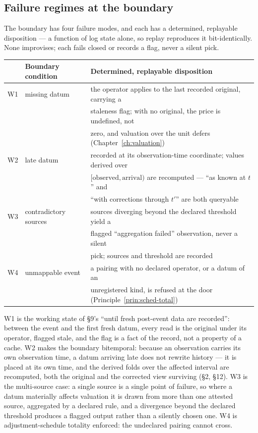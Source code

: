 \subsection{Failure regimes at the boundary}\label{sec:failures}

The boundary has four failure modes, and each has a determined, replayable disposition --- a
function of log state alone, so replay reproduces it bit-identically. None improvises; each
fails closed or records a flag, never a silent pick.

\begin{center}
\begin{tabular}{@{}lll@{}}
\toprule
 & Boundary condition & Determined, replayable disposition \\
\midrule
W1 & missing datum & the operator applies to the last recorded original, carrying a \\
   &               & staleness flag; with no original, the price is undefined, not \\
   &               & zero, and valuation over the unit defers (Chapter~\ref{ch:valuation}) \\
W2 & late datum & recorded at its observation-time coordinate; values derived over \\
   &            & $[\text{observed},\text{arrival})$ are recomputed --- ``as known at $t$'' and \\
   &            & ``with corrections through $t'$'' are both queryable \\
W3 & contradictory sources & sources diverging beyond the declared threshold yield a \\
   &                       & flagged ``aggregation failed'' observation, never a silent \\
   &                       & pick; sources and threshold are recorded \\
W4 & unmappable event & a pairing with no declared operator, or a datum of an \\
   &                  & unregistered kind, is refused at the door (Principle~\ref{prin:sched-total}) \\
\bottomrule
\end{tabular}
\end{center}

\noindent W1 is the working state of \S 9's ``until fresh post-event data are recorded'':
between the event and the first fresh datum, every read is the original under its operator,
flagged stale, and the flag is a fact of the record, not a property of a cache. W2 makes the
boundary bitemporal: because an observation carries its own observation time, a datum
arriving late does not rewrite history --- it is placed at its own time, and the derived
folds over the affected interval are recomputed, both the original and the corrected view
surviving (\S 2, \S 12). W3 is the multi-source case: a single source is a single point of
failure, so where a datum materially affects valuation it is drawn from more than one
attested source, aggregated by a declared rule, and a divergence beyond the declared
threshold produces a flagged output rather than a silently chosen one. W4 is
adjustment-schedule totality enforced: the undeclared pairing cannot cross.

